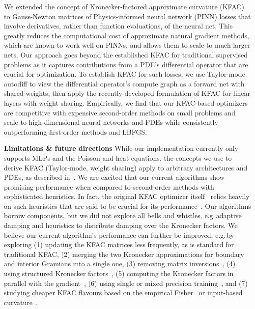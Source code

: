 We extended the concept of Kronecker-factored approximate curvature (KFAC) to Gauss-Newton matrices of Physics-informed neural network (PINN) losses that involve derivatives, rather than function evaluations, of the neural net.
This greatly reduces the computational cost of approximate natural gradient methods, which are known to work well on PINNs, and allows them to scale to much larger nets.
Our approach goes beyond the established KFAC for traditional supervised problems as it captures contributions from a PDE's differential operator that are crucial for optimization.
To establish KFAC for such losses, we use Taylor-mode autodiff to view the differential operator's compute graph as a forward net with shared weights, then apply the recently-developed formulation of KFAC for linear layers with weight sharing.
Empirically, we find that our KFAC-based optimizers are competitive with expensive second-order methods on small problems and scale to high-dimensional neural networks and PDEs while consistently outperforming first-order methods and LBFGS.

\textbf{Limitations \& future directions} While our implementation currently only supports MLPs and the Poisson and heat equations, the concepts we use to derive KFAC (Taylor-mode, weight sharing) apply to arbitrary architectures and PDEs, as described in~.
We are excited that our current algorithms show promising performance when compared to second-order methods with sophisticated heuristics.
In fact, the original KFAC optimizer itself~\cite{martens2015optimizing} relies heavily on such heuristics that are said to be crucial for its performance~\cite{clarke2023adam}.
Our algorithms borrow components, but we did not explore all bells and whistles, e.g.\,adaptive damping and heuristics to distribute damping over the Kronecker factors.
We believe our current algorithm's performance can further be improved, e.g.\,by exploring (1) updating the KFAC matrices less frequently, as is standard for traditional KFAC, (2) merging the two Kronecker approximations for boundary and interior Gramians into a single one, (3) removing matrix inversions~\cite{lin2023simplifying}, (4) using structured Kronecker factors~\cite{lin2023structured}, (5) computing the Kronecker factors in parallel with the gradient~\cite{dangel2020backpack}, (6) using single or mixed precision training~\cite{micikevicius2017mixed}, and (7) studying cheaper KFAC flavours based on the empirical Fisher~\cite{kunstner2019limitations} or input-based curvature~\cite{benzing2022gradient,petersen2023isaac}.
